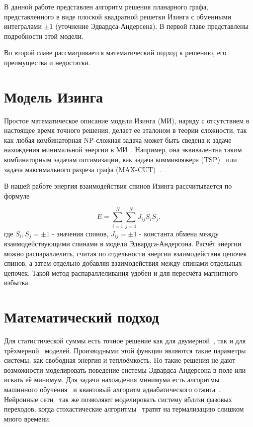\documentclass[10pt]{article}
\begin{document}
	В данной работе представлен алгоритм решения планарного графа, представленного в виде плоской квадратной решетки Изинга с обменными интегралами $\pm 1$ (уточнение Эдвардса-Андерсена). В первой главе представлены подробности этой модели.
	
	Во второй главе рассматривается математический подход к решению, его преимущества и недостатки.
	
	\section{Модель Изинга}
	Простое математическое описание модели Изинга (МИ), наряду с отсутствием в настоящее время точного решения, делает ее эталоном в теории сложности, так как любая комбинаторная NP-сложная задача может быть сведена к задаче нахождения минимальной энергии в МИ~\cite{Markovich2019}. Например, она эквивалентна таким комбинаторным задачам оптимизации, как задача коммивояжера (TSP)~\cite{papadimitriou1977euclidean} или задача максимального разреза графа ({}MAX-CUT)~\cite{karp2010reducibility}.
	
	В нашей работе энергия взаимодействия спинов Изинга рассчитывается по формуле
	
	\begin{equation}
		E = \sum\limits_{i=1}^N \sum\limits_{j=1}^N J_{ij} S_i S_j,
	\end{equation}
	где $S_i, S_j = \pm 1$ - значения спинов, $J_{ij} = \pm 1$ - константа обмена между взаимодействующими спинами в модели Эдвардса-Андерсона. Расчёт энергии можно распараллелить, считая по отдельности энергии взаимодействия цепочек спинов, а затем отдельно добавляя взаимодействия между спинами отдельных цепочек. Такой метод распараллеливания удобен и для пересчёта магнитного избытка. 
	
	\section{Математический подход}
	
	Для статистической суммы есть точное решение как для двумерной~\cite{onsager1944crystal}, так и для трёхмерной~\cite{zhang2023exact} моделей. Производными этой функции являются такие параметры системы, как свободная энергия и теплоёмкость. Но такие решения не дают возможности моделировать поведение системы Эдвардса-Андерсона в поле или искать её минимум. Для задачи нахождения минимума есть алгоритмы машинного обучения~\cite{maren1991logical} и квантовый алгоритм адиабатического отжига~\cite{grant2020adiabatic}. Нейронные сети~\cite{Korol2021} так же позволяют моделировать систему вблизи фазовых переходов, когда стохастические алгоритмы~\cite{janke2008monte} тратят на термализацию слишком много времени.
	
\end{document}
